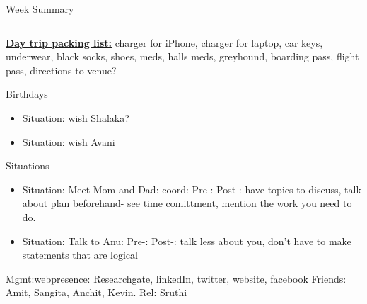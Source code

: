 \documentclass[serif, mathserif, final]{beamer}
\begin{document}
\begin{frame}
\begin{columns}
\begin{column}{0.5\linewidth}
\begin{block}{Week Summary}
\begin{column}{0.25\linewidth}

      \textbf{\underline{Day trip packing list:}} charger for iPhone, charger for laptop,
      car keys, underwear, black socks, shoes, meds, halls meds, greyhound,
      boarding pass, flight pass, directions to venue? \\ 

      \begin{block} {Birthdays}       
        \begin{itemize} 
        \tiny  \item \tiny Situation: wish Shalaka? 
        \item \tiny Situation: wish Avani 
        \end{itemize} 
      \end{block} 

      \begin{block}{Situations}

        \begin{itemize}
          \tiny \item \tiny Situation: Meet Mom and Dad:  coord:
          Pre-:  Post-: have topics to discuss, talk about plan
          beforehand- see time comittment, mention the work you need to do.  
      
          
        \item \tiny Situation: Talk to Anu:  Pre-:   Post-:  talk less
          about you, don't have to make statements that are logical 
 
        \end{itemize} 
      \end{block}


\begin{block}
  Mgmt:webpresence:
  Researchgate, linkedIn, twitter, website, facebook
  Friends: Amit, Sangita, Anchit, Kevin.
  Rel: Sruthi
\end{block}


\end{column}
\end{block}
\end{column}
\end{columns}
\end{frame}
\end{document}
